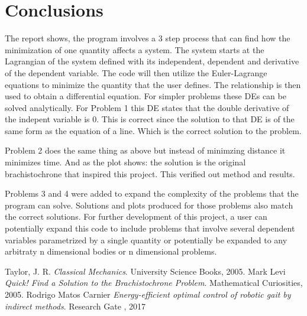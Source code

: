 \documentclass[hidelinks, 11pt]{article}
\begin{document}
\section{Conclusions}
The report shows, the program involves a 3 step process that can find how the minimization of one quantity affects a system. 
The system starts at the Lagrangian of the system defined with its independent, dependent and derivative of the dependent variable. The code will then utilize the Euler-Lagrange equations to minimize the quantity that the user defines. The relationship is then used to obtain a differential equation. For simpler problems these DEs can be solved analytically. For Problem 1 this DE states that the double derivative of the indepent variable is 0. This is correct since the solution to that DE is of the same form as the equation of a line. Which is the correct solution to the problem. 

Problem 2 does the same thing as above but instead of minimzing distance it minimizes time. And as the plot shows: the solution is the original brachistochrone that inspired this project. This verified out method and results.

Problems 3 and 4 were added to expand the complexity of the problems that the program can solve. Solutions and plots produced for those problems also match the correct solutions. 
For further development of this project, a user can potentially expand this code to include problems that involve several dependent variables parametrized by a single quantity or potentially be expanded to any arbitraty n dimensional bodies or n dimensional problems.


\begin{thebibliography}{1}

 Taylor, J. R. \textit{Classical
  Mechanics}. University Science Books, 2005. 
 Mark Levi \textit{Quick! Find a Solution to the
Brachistochrone Problem}. Mathematical Curiosities, 2005. 
 Rodrigo Matos Carnier \textit{Energy-efficient optimal control of robotic gait by indirect methods}. Research Gate , 2017

\end{thebibliography}
\end{document}
